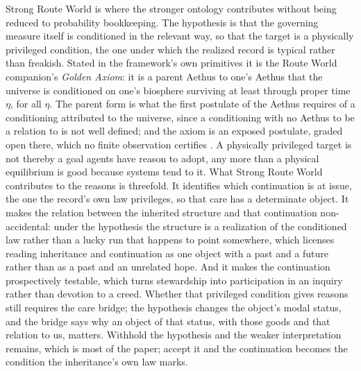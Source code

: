 Strong Route World is where the stronger ontology contributes without being
reduced to probability bookkeeping. The hypothesis is that the governing measure itself is
conditioned in the relevant way, so that the target is a physically privileged
condition, the one under which the realized record is typical rather than
freakish. Stated in the framework's own primitives it is the Route World
companion's \emph{Golden Axiom}: it is a parent Aethus to one's Aethus that
the universe is conditioned on one's biosphere surviving at least through
proper time $\eta$, for all $\eta$. The parent form is what the first
postulate of the Aethus requires of a conditioning attributed to the
universe, since a conditioning with no Aethus to be a relation to is not
well defined; and the axiom is an exposed postulate, graded open there,
which no finite observation certifies \cite{GoldenRouteWorld,Aethus}. A physically privileged target is not thereby a goal agents have
reason to adopt, any more than a physical equilibrium is good because systems
tend to it. What Strong Route
World contributes to the reasons is threefold. It identifies which
continuation is at issue, the one the record's own law privileges, so that
care has a determinate object. It makes the relation between the inherited
structure and that continuation non-accidental: under the hypothesis the
structure is a realization of the conditioned law rather than a lucky run
that happens to point somewhere, which licenses reading inheritance and
continuation as one object with a past and a future rather than as a past and
an unrelated hope. And it makes the continuation prospectively testable, which
turns stewardship into participation in an inquiry rather than devotion to a
creed. Whether that
privileged condition gives reasons still requires the care bridge; the
hypothesis changes the object's modal status, and the bridge says why an
object of that status, with those goods and that relation to us, matters.
Withhold the hypothesis and the weaker interpretation remains, which is most
of the paper; accept it and the continuation becomes the condition the
inheritance's own law marks.

